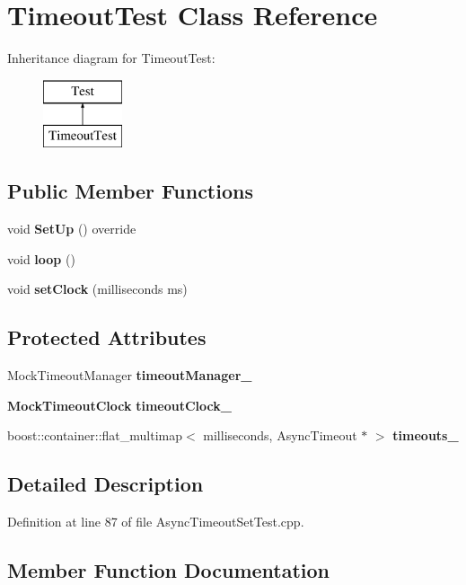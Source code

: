 \section{Timeout\+Test Class Reference}
\label{classTimeoutTest}
Inheritance diagram for Timeout\+Test\+:\begin{figure}[H]
\begin{center}
\leavevmode
\includegraphics[height=2.000000cm]{classTimeoutTest}
\end{center}
\end{figure}
\subsection*{Public Member Functions}
\begin{DoxyCompactItemize}
\item 
void {\bf Set\+Up} () override
\item 
void {\bf loop} ()
\item 
void {\bf set\+Clock} (milliseconds ms)
\end{DoxyCompactItemize}
\subsection*{Protected Attributes}
\begin{DoxyCompactItemize}
\item 
Mock\+Timeout\+Manager {\bf timeout\+Manager\+\_\+}
\item 
{\bf Mock\+Timeout\+Clock} {\bf timeout\+Clock\+\_\+}
\item 
boost\+::container\+::flat\+\_\+multimap$<$ milliseconds, Async\+Timeout $\ast$ $>$ {\bf timeouts\+\_\+}
\end{DoxyCompactItemize}


\subsection{Detailed Description}


Definition at line 87 of file Async\+Timeout\+Set\+Test.\+cpp.



\subsection{Member Function Documentation}
